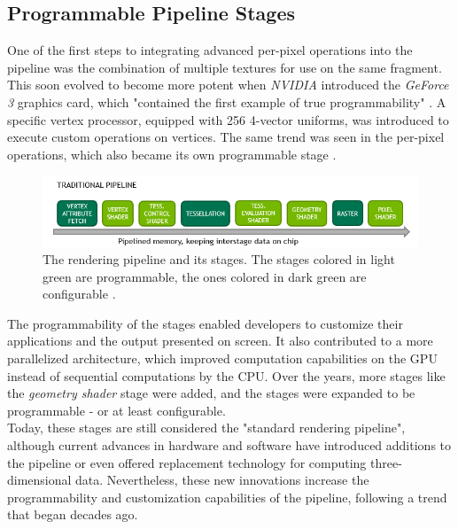 \subsection*{Programmable Pipeline Stages}
 
One of the first steps to integrating advanced per-pixel operations into the pipeline was the combination of
multiple textures for use on the same fragment. This soon evolved to become more potent when \emph{NVIDIA} 
introduced the \emph{GeForce 3} graphics card, which "contained the first example of true programmability" 
\cite{KhronosProgramibility2024}. A specific vertex processor, equipped with 256 4-vector uniforms, was 
introduced to execute custom operations on vertices. The same trend was seen in the per-pixel operations, 
which also became its own programmable stage \cite{KhronosProgramibility2024}. \\

\begin{figure}[h]
    \centering
    \includegraphics[width=\linewidth]{images/graphics/traditional-rendering-pipeline.jpg}
    \caption{The rendering pipeline and its stages. The stages colored in light green are programmable, 
    the ones colored in dark green are configurable \cite{Kubisch2018}.}
    \label{fig:traditional-rendering-pipeline}
\end{figure}

\noindent
The programmability of the stages enabled developers to customize their applications and the output presented 
on screen. It also contributed to a more parallelized architecture, which improved computation capabilities on 
the \ac{GPU} instead of sequential computations by the \ac{CPU}. Over the years, more stages like the 
\emph{geometry shader} stage were added, and the stages were expanded to be programmable - or at least configurable. \\

\noindent
Today, these stages are still considered the "standard rendering pipeline", although current advances in 
hardware and software have introduced additions to the pipeline or even offered replacement technology 
for computing three-dimensional data. Nevertheless, these new innovations increase the programmability 
and customization capabilities of the pipeline, following a trend that began decades ago.


